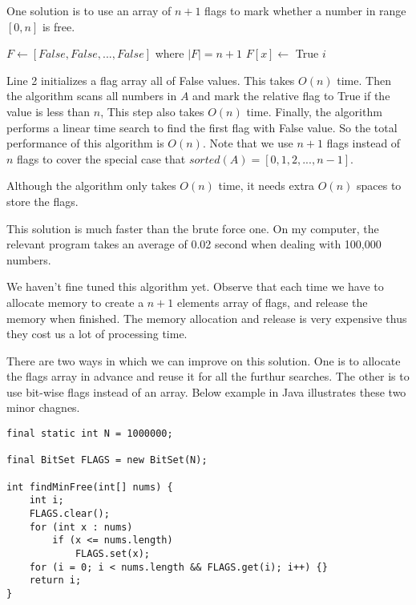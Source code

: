 \documentclass{article}
\begin{document}
One solution is to use an array of $n+1$ flags to mark whether a number
in range $[0, n]$ is free.

\begin{algorithmic}[1]
  \State $F \gets [False, False, ..., False]$ where $|F| = n+1$
      \State $F[x] \gets$ True
    \EndIf
  \EndFor
      \State \Return $i$
    \EndIf
  \EndFor
\EndFunction
\end{algorithmic}

Line 2 initializes a flag array all of False values. This takes
$O(n)$ time. Then the algorithm scans all numbers in $A$ and mark
the relative flag to True if the value is less than $n$, This
step also takes $O(n)$ time. Finally, the algorithm performs a
linear time search to find the first flag with False value.
So the total performance of this algorithm is $O(n)$. Note that
we use $n+1$ flags instead of $n$ flags to cover the special case
that $sorted(A) = [0, 1, 2, ..., n-1]$.

Although the algorithm only takes $O(n)$ time, it needs extra
$O(n)$ spaces to store the flags.

This solution is much faster than the brute force one. On my
computer, the relevant program takes
an average of 0.02 second when dealing with 100,000 numbers.

We haven't fine tuned this algorithm yet. Observe that each time
we have to allocate memory to create a $n+1$ elements array of
flags, and release the memory when finished.
The memory allocation and release is very
expensive thus they cost us a lot of processing time.

There are two ways in which we can improve on
this solution. One is to allocate the flags array in advance
and reuse it for all the furthur searches.
The other is to use bit-wise flags instead of an array.
Below example in Java illustrates these two minor chagnes.

\lstset{language = Java}
\begin{lstlisting}
final static int N = 1000000;

final BitSet FLAGS = new BitSet(N);

int findMinFree(int[] nums) {
    int i;
    FLAGS.clear();
    for (int x : nums)
        if (x <= nums.length)
            FLAGS.set(x);
    for (i = 0; i < nums.length && FLAGS.get(i); i++) {}
    return i;
}
\end{lstlisting}
\end{document}
